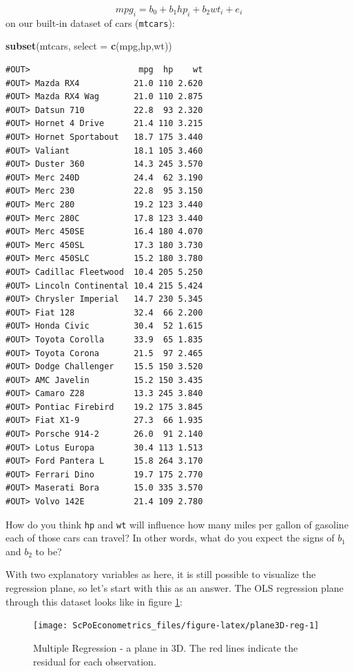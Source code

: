 \documentclass[]{book}
\newenvironment{Shaded}{\begin{snugshade}}{\end{snugshade}}
\newcommand{\KeywordTok}[1]{\textcolor[rgb]{0.13,0.29,0.53}{\textbf{#1}}}
\newcommand{\DataTypeTok}[1]{\textcolor[rgb]{0.13,0.29,0.53}{#1}}
\newcommand{\NormalTok}[1]{#1}
\theoremstyle{definition}
\theoremstyle{definition}
\theoremstyle{definition}
\theoremstyle{remark}
\begin{document}
\[
mpg_i = b_0 + b_1 hp_i + b_2 wt_i + e_i \label{eq:abline2d}
\] on our built-in dataset of cars (\texttt{mtcars}):

\begin{Shaded}
\begin{Highlighting}[]
\KeywordTok{subset}\NormalTok{(mtcars, }\DataTypeTok{select =} \KeywordTok{c}\NormalTok{(mpg,hp,wt))}
\end{Highlighting}
\end{Shaded}

\begin{verbatim}
#OUT>                      mpg  hp    wt
#OUT> Mazda RX4           21.0 110 2.620
#OUT> Mazda RX4 Wag       21.0 110 2.875
#OUT> Datsun 710          22.8  93 2.320
#OUT> Hornet 4 Drive      21.4 110 3.215
#OUT> Hornet Sportabout   18.7 175 3.440
#OUT> Valiant             18.1 105 3.460
#OUT> Duster 360          14.3 245 3.570
#OUT> Merc 240D           24.4  62 3.190
#OUT> Merc 230            22.8  95 3.150
#OUT> Merc 280            19.2 123 3.440
#OUT> Merc 280C           17.8 123 3.440
#OUT> Merc 450SE          16.4 180 4.070
#OUT> Merc 450SL          17.3 180 3.730
#OUT> Merc 450SLC         15.2 180 3.780
#OUT> Cadillac Fleetwood  10.4 205 5.250
#OUT> Lincoln Continental 10.4 215 5.424
#OUT> Chrysler Imperial   14.7 230 5.345
#OUT> Fiat 128            32.4  66 2.200
#OUT> Honda Civic         30.4  52 1.615
#OUT> Toyota Corolla      33.9  65 1.835
#OUT> Toyota Corona       21.5  97 2.465
#OUT> Dodge Challenger    15.5 150 3.520
#OUT> AMC Javelin         15.2 150 3.435
#OUT> Camaro Z28          13.3 245 3.840
#OUT> Pontiac Firebird    19.2 175 3.845
#OUT> Fiat X1-9           27.3  66 1.935
#OUT> Porsche 914-2       26.0  91 2.140
#OUT> Lotus Europa        30.4 113 1.513
#OUT> Ford Pantera L      15.8 264 3.170
#OUT> Ferrari Dino        19.7 175 2.770
#OUT> Maserati Bora       15.0 335 3.570
#OUT> Volvo 142E          21.4 109 2.780
\end{verbatim}

How do you think \texttt{hp} and \texttt{wt} will influence how many
miles per gallon of gasoline each of those cars can travel? In other
words, what do you expect the signs of \(b_1\) and \(b_2\) to be?

With two explanatory variables as here, it is still possible to
visualize the regression plane, so let's start with this as an answer.
The OLS regression plane through this dataset looks like in figure
\ref{fig:plane3D-reg}:

\begin{figure}

{\centering \texttt{[image: ScPoEconometrics\_files/figure-latex/plane3D-reg-1]} 

}

\caption{Multiple Regression - a plane in 3D. The red lines indicate the residual for each observation.}\label{fig:plane3D-reg}
\end{figure}
\end{document}
